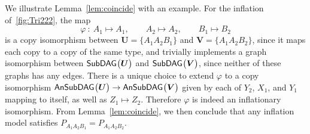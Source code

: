 We illustrate Lemma~\ref{lem:coincide} with an example. For the inflation of~\cref{fig:Tri222}, the map
\[
	\varphi \: : \: A_1 \mapsto A_1,\qquad A_2\mapsto A_2,\qquad B_1\mapsto B_2
\]
is a copy isomorphism between $\bm{U}=\{A_1 A_2 B_1\}$ and $\bm{V}=\{A_1 A_2 B_2\}$, since it maps each copy to a copy of the same type, and trivially implements a graph isomorphism between ${\operatorname{\mathsf{SubDAG}}_{}}\bigl\lparen\bm{U}\bigr\rparen$ and ${\operatorname{\mathsf{SubDAG}}_{}}\bigl\lparen\bm{V}\bigr\rparen$, since neither of these graphs has any edges. There is a unique choice to extend $\varphi$ to a copy isomorphism ${\operatorname{\mathsf{AnSubDAG}}_{}}\bigl\lparen\bm{U}\bigr\rparen\to{\operatorname{\mathsf{AnSubDAG}}_{}}\bigl\lparen\bm{V}\bigr\rparen$ given by each of $Y_2$, $X_1$, and $Y_1$ mapping to itself, as well as $Z_1\mapsto Z_2$. Therefore $\varphi$ is indeed an inflationary isomorphism. From Lemma~\ref{lem:coincide}, we then conclude that any inflation model satisfies $P_{A_1 A_2 B_1} = P_{A_1 A_2 B_2}$.

